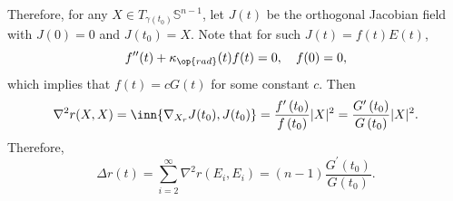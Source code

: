 Therefore, for any $X \in T_{\gamma(t_0)}\mathbb{S}^{n-1}$, let $J(t)$ be the orthogonal Jacobian field with $J(0) = 0$ and $J(t_0) = X$. Note that for such $J(t) = f(t)E(t)$,
\begin{equation*}
    f^{\prime\prime}(t) + \kappa_{\op{rad}}(t) f(t) = 0,\quad f(0) = 0,
\end{equation*}
which implies that $f(t) = cG(t)$ for some constant $c$. Then
\begin{equation*}
    \nabla^2r(X,X) = \inn{\nabla_{X_r}J(t_0),J(t_0)} = \frac{f^{\prime}\left(t_0\right)}{f\left(t_0\right)}|X|^2 = \frac{G^{\prime}\left(t_0\right)}{G\left(t_0\right)}|X|^2.
\end{equation*}
Therefore,
\begin{equation*}
    \Delta r(t) = \sum_{i=2}^\infty \nabla^2r(E_i,E_i) = (n-1)\frac{G^{\prime}\left(t_0\right)}{G\left(t_0\right)}.
\end{equation*}

